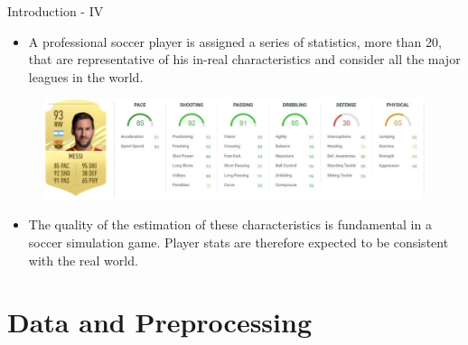 \documentclass[aspectratio=169,xcolor=dvipsnames]{beamer}
\begin{document}

\begin{frame}{Introduction - IV}
\begin{itemize}

\item A professional soccer player is assigned a series of statistics, more than 20, that are representative of his in-real characteristics and consider all the major leagues in the world.
\end{itemize}
\begin{figure}[H] 
\begin{center} 
  \includegraphics[width=13.5cm]{fine.jpg}\\ 
\end{center} 
\end{figure}
\begin{itemize}

\item The quality of the estimation of these characteristics is fundamental in a soccer simulation game. Player stats are therefore expected to be consistent with the real world. 
\end{itemize}
\end{frame}


\section{Data and Preprocessing}
\end{document}
